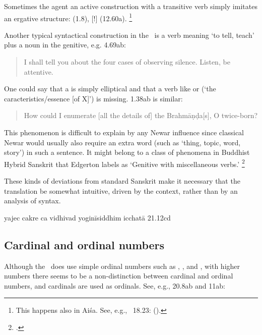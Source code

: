 Sometimes the agent an active construction with a transitive verb
simply imitates an ergative structure:  (1.8),
[!]  (12.60a).%
		\footnote{This happens also in Aiśa. See, e.g., \SiddhYogMata\ 18.23: 
		 ().}

Another typical syntactical construction in the \VSS\ is a verb
meaning `to tell, teach' plus a noun in the genitive, e.g. 4.69ab:

\begin{quote}

        I shall tell you about the four cases of observing silence. 
        Listen, be attentive.
\end{quote}

\noindent
One could say that  a is simply elliptical and that
a verb like  or  
(`the caracteristics/essence [of X]') is missing. 1.38ab is similar:

\begin{quote}

How could I enumerate [all the details of] the Brahmāṇḍa[s], O twice-born?
\end{quote}

\noindent
This phenomenon is difficult to explain by any Newar influence since
classical Newar would usually also require an 
extra word (such as  `thing, topic, word, story') in such a sentence.
It might belong to a class of phenomena in Buddhist Hybrid Sanskrit 
that Edgerton labels as `Genitive with miscellaneous verbs.'%
		\footnote{.}

These kinds of deviations from standard Sanskrit make it
necessary that the translation be somewhat intuitive,
driven by the context, rather than by an analysis of syntax.




yajec cakre ca vidhivad yoginīsiddhim icchatā 21.12cd


\subsection{Cardinal and ordinal numbers}

Although the \VSS\ does use simple ordinal numbers such 
as , , and , with higher 
numbers there seems to be a non-distinction between cardinal
and ordinal numbers, and cardinals are used as ordinals.
See, e.g., 20.8ab and 11ab:

